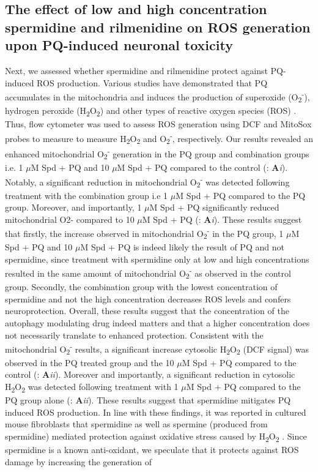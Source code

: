 \subsection{The effect of low and high concentration spermidine and rilmenidine on ROS generation upon PQ-induced neuronal toxicity}
Next, we assessed whether spermidine and rilmenidine protect against PQ-induced ROS production. Various studies have demonstrated that PQ accumulates in the mitochondria and induces the production of superoxide (O\textsubscript{2}\textsuperscript{-}), hydrogen peroxide (H\textsubscript{2}O\textsubscript{2}) and other types of reactive oxygen species (ROS) \citep{Cocheme2008,Jones2000,Yumino2002}. Thus, flow cytometer was used to assess ROS generation using DCF and MitoSox probes to measure to measure H\textsubscript{2}O\textsubscript{2} and O\textsubscript{2}\textsuperscript{-}, respectively. Our results revealed an enhanced mitochondrial O\textsubscript{2}\textsuperscript{-}  generation in the PQ group and combination groups i.e. 1 $\mu$M Spd + PQ and 10 $\mu$M Spd + PQ compared to the control (: \textbf{A}\textit{i}). Notably, a significant reduction in mitochondrial O\textsubscript{2}\textsuperscript{-} was detected following treatment with the combination group i.e 1 $\mu$M Spd + PQ compared to the PQ group. Moreover, and importantly, 1 $\mu$M Spd + PQ significantly reduced mitochondrial O2- compared to 10 $\mu$M Spd + PQ (: \textbf{A}\textit{i}). These results suggest that firstly, the increase observed in mitochondrial O\textsubscript{2}\textsuperscript{-} in the PQ group, 1 $\mu$M Spd + PQ and 10 $\mu$M Spd + PQ is indeed likely the result of PQ and not spermidine, since treatment with spermidine only at low and high concentrations resulted in the same amount of mitochondrial O\textsubscript{2}\textsuperscript{-} as observed in the control group. Secondly, the combination group with the lowest concentration of spermidine and not the high concentration decreases ROS levels and confers neuroprotection. Overall, these results suggest that the concentration of the autophagy modulating drug indeed matters and that a higher concentration does not necessarily translate to enhanced protection. Consistent with the mitochondrial O\textsubscript{2}\textsuperscript{-} results, a significant increase cytosolic H\textsubscript{2}O\textsubscript{2} (DCF signal) was observed in the PQ treated group and the 10 $\mu$M Spd + PQ compared to the control (: \textbf{A}\textit{ii}). Moreover and importantly, a significant reduction in cytosolic H\textsubscript{2}O\textsubscript{2} was detected following treatment with 1 $\mu$M Spd + PQ compared to the PQ group alone (: \textbf{A}\textit{ii}). These results suggest that spermidine mitigates PQ induced ROS production. In line with these findings, it was reported in cultured mouse fibroblasts that spermidine as well as spermine (produced from spermidine) mediated protection against oxidative stress caused by H\textsubscript{2}O\textsubscript{2} \citep{Rider2007}. Since spermidine is a known anti-oxidant, we speculate that it protects against ROS damage by increasing the generation of 